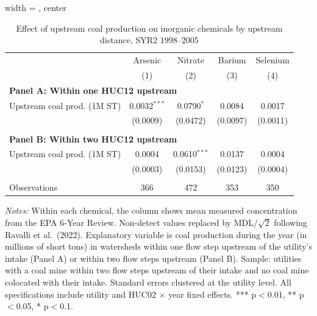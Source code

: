 \begin{table}[htbp]
   
   \caption{\label{tab:6yr_huc02fe_inorg_ravalli_2005_k2annprod} Effect of upstream coal production on inorganic chemicals by upstream distance, SYR2 1998--2005}
   \bigskip
   
   \centering
   
\begin{adjustbox}{width = \textwidth, center}
   \begin{tabular}{lcccc}
      \toprule
       & Arsenic & Nitrate & Barium & Selenium \\
                                  & (1)            & (2)          & (3)      & (4)\\  
      \midrule 
      \multicolumn{5}{l}{\textbf{Panel A: Within one HUC12 upstream}} \\
      Upstream coal prod. (1M ST) & 0.0032$^{***}$ & 0.0790$^{*}$ & 0.0084   & 0.0017\\   
                                  & (0.0009)       & (0.0472)     & (0.0097) & (0.0011)\\   
       \\
      \midrule 
      \multicolumn{5}{l}{\textbf{Panel B: Within two HUC12 upstream}} \\
      Upstream coal prod. (1M ST) & 0.0004   & 0.0610$^{***}$ & 0.0137   & 0.0004\\   
                                  & (0.0003) & (0.0153)       & (0.0123) & (0.0004)\\   
       \\
      Observations                & 366      & 472            & 353      & 350\\  
      \bottomrule
   \end{tabular}
\end{adjustbox}
   
   {\tiny\linespread{1}\selectfont \par \raggedright 
   \textit{Notes:} Within each chemical, the column shows mean measured concentration from the EPA 6-Year Review. Non-detect values replaced by MDL$/\sqrt{2}$ following Ravalli et al.~(2022). Explanatory variable is coal production during the year (in millions of short tons) in watersheds within one flow step upstream of the utility's intake (Panel A) or within two flow steps upstream (Panel B). Sample: utilities with a coal mine within two flow steps upstream of their intake and no coal mine colocated with their intake. Standard errors clustered at the utility level. All specifications include utility and HUC02 $\times$ year fixed effects. *** p$<$0.01, ** p$<$0.05, * p$<$0.1.}
   
\end{table}


